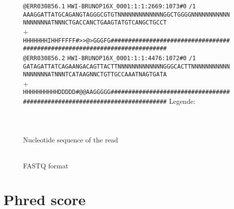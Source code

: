 \begin{figure}[!htbp]
\begin{minipage}[adjusting]{\textwidth}
{\small
{\color[rgb]{0.447059,0.678431,0.274510}\verb!@ERR030856.1!}
{\color[rgb]{0.500000,0.500000,0.500000}\verb!HWI-BRUNOP16X_0001:1:1:2669:1073#0!}%
{\color[rgb]{1.000000,0.000000,0.000000}\verb!/1!}\\
\verb!AAAGGATTATGCAGANGTAGGGCGTGTNNNNNNNNNNNNNGGCTGGGGNNNNNNNNNNNNNNNNNNATNNNCTGACCANCTGAAGTATGTCANGCTGCCT!\\
{\color[rgb]{0.698039,0.145098,0.450980}+}\\
{\color[rgb]{0.000000,0.000000,0.555711}\verb!HHHHHHHIHHFFFFF#>>@>GGGFG###########################################################################!}\\
{\color[rgb]{0.447059,0.678431,0.274510}\verb!@ERR030856.2!}
{\color[rgb]{0.500000,0.500000,0.500000}\verb!HWI-BRUNOP16X_0001:1:1:4476:1072#0!}%
{\color[rgb]{1.000000,0.000000,0.000000}\verb!/1!}\\
\verb!GATAGATTATCAGAANGACAGTTACTTNNNNNNNNNNNNNGGGCACTTNNNNNNNNNNNNNNNNNNATNNNTCATAAGNNCTGTTGCCAAATNAGTGATA!\\
{\color[rgb]{0.698039,0.145098,0.450980}+}\\
{\color[rgb]{0.000000,0.000000,0.555711}\verb!HHHHHHHHHHDDDDD#@@AAGGGGG###########################################################################!}
}
{\footnotesize
Legende:\\
\\
\\
\\
\quad\textbullet Nucleotide sequence of the read\\
\\
}
\end{minipage}
\caption{FASTQ format}\label{fig:fastqFormat}
\end{figure}

\FloatBarrier

\section{Phred score}\label{sec:PhredScore}

